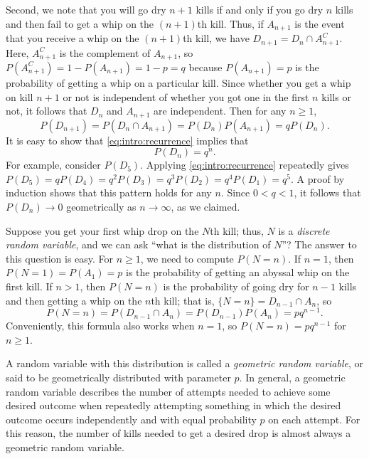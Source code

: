 \documentclass[letterpaper]{article}
\begin{document}
	Second, we note that you will go dry $n+1$ kills if and only if you go dry $n$ kills and then fail to get a whip on the $(n+1)$th kill. Thus, if $A_{n+1}$ is the event that you receive a whip on the $(n+1)$th kill, we have $D_{n+1} = D_n \cap A_{n+1}^C$. Here, $A_{n+1}^C$ is the complement of $A_{n+1}$, so $P(A_{n+1}^C) = 1-P(A_{n+1}) = 1-p = q$ because $P(A_{n+1}) = p$ is the probability of getting a whip on a particular kill. Since whether you get a whip on kill $n+1$ or not is independent of whether you got one in the first $n$ kills or not, it follows that $D_n$ and $A_{n+1}$ are independent. Then for any $n \ge 1$,
	\begin{equation}
		\label{eq:intro:recurrence}
		P(D_{n+1}) = P(D_{n}\cap A_{n+1}) = P(D_n)P(A_{n+1}) = qP(D_n).
	\end{equation}
	It is easy to show that \eqref{eq:intro:recurrence} implies that
	\begin{equation}
		P(D_n) = q^n.
	\end{equation}
	For example, consider $P(D_5)$. Applying \eqref{eq:intro:recurrence} repeatedly gives $P(D_5) = qP(D_4) = q^2P(D_3) = q^3 P(D_2) = q^4P(D_1) = q^5$. A proof by induction shows that this pattern holds for any $n$. Since $0 < q < 1$, it follows that $P(D_n) \to 0$ geometrically as $n \to \infty$, as we claimed. 
	
	Suppose you get your first whip drop on the $N$th kill; thus, $N$ is a \textit{discrete random variable}, and we can ask ``what is the distribution of $N$''? The answer to this question is easy. For $n \ge 1$, we need to compute $P(N{=}n)$. If $n=1$, then $P(N{=}1) = P(A_1) = p$ is the probability of getting an abyssal whip on the first kill. If $n > 1$, then $P(N{=}n)$ is the probability of going dry for $n-1$ kills and then getting a whip on the $n$th kill; that is, $\{N{=}n\} = D_{n-1}\cap A_n$, so
	\begin{equation}
		\label{eq:intro:geometric}
		P(N{=}n) = P(D_{n-1}\cap A_n) = P(D_{n-1})P(A_n) = pq^{n-1}.
	\end{equation}
	Conveniently, this formula also works when $n=1$, so $P(N{=}n) = pq^{n-1}$ for $n \ge 1$. 
	
	A random variable with this distribution is called a \textit{geometric random variable}, or said to be geometrically distributed with parameter $p$. In general, a geometric random variable describes the number of attempts needed to achieve some desired outcome when repeatedly attempting something in which the desired outcome occurs independently and with equal probability $p$ on each attempt. For this reason, the number of kills needed to get a desired drop is almost always a geometric random variable. 
	
\end{document}
